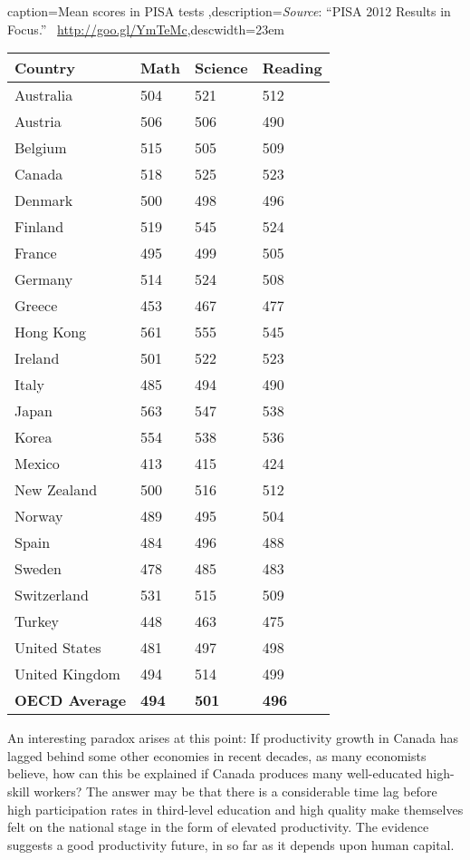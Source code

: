 \begin{Table}{caption={Mean scores in PISA tests \label{table:sciencereading}},description={\textit{Source}: ``PISA 2012 Results in	Focus.'' \ \url{http://goo.gl/YmTeMc}},descwidth={23em}}
	\begin{tabu} to \linewidth {|X[2,l]X[1,c]X[1,c]X[1,c]|} \hline 
			\textbf{Country} & \textbf{Math} & \textbf{Science} & \textbf{Reading} \\ \hline
		Australia & 504 & 521 & 512 \\ 
			Austria & 506 & 506 & 490 \\ 
		Belgium & 515 & 505 & 509 \\ 
			Canada & 518 & 525 & 523 \\ 
		Denmark & 500 & 498 & 496 \\ 
			Finland & 519 & 545 & 524 \\ 
		France & 495 & 499 & 505 \\ 
			Germany & 514 & 524 & 508 \\ 
		Greece & 453 & 467 & 477 \\ 
			Hong Kong & 561 & 555 & 545 \\ 
		Ireland & 501 & 522 & 523 \\ 
			Italy & 485 & 494 & 490 \\ 
		Japan & 563 & 547 & 538 \\ 
			Korea & 554 & 538 & 536 \\ 
		Mexico & 413 & 415 & 424 \\ 
			New Zealand & 500 & 516 & 512 \\ 
		Norway & 489 & 495 & 504 \\ 
			Spain & 484 & 496 & 488 \\ 
		Sweden & 478 & 485 & 483 \\ 
			Switzerland  & 531 & 515 & 509 \\ 
		Turkey & 448 & 463 & 475 \\ 
			United States & 481 & 497 & 498 \\ 
		United Kingdom & 494 & 514 & 499 \\ 
			\textbf{OECD Average} & \textbf{494} & \textbf{501} & \textbf{496} \\ \hline  
	\end{tabu}
\end{Table}

\newhtmlpage


An interesting paradox arises at this point: If productivity growth in
Canada has lagged behind some other economies in recent decades, as many
economists believe, how can this be explained if Canada produces 
many well-educated high-skill workers? The answer may
be that there is a considerable time lag before high participation rates in
third-level education and high quality make themselves felt on the national
stage in the form of elevated productivity. The evidence suggests a good
productivity future, in so far as it depends upon human capital. 
